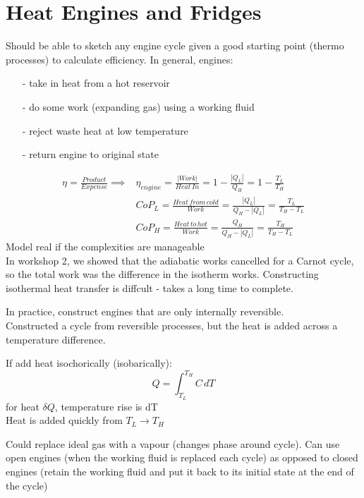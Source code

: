 \documentclass[a4paper, 11pt, normalem]{report}
\begin{document}
\section{Heat Engines and Fridges}
Should be able to sketch any engine cycle given a good starting point (thermo processes) to calculate efficiency. In general, engines:
\begin{itemize}
    \item[-] take in heat from a hot reservoir
    \item[-] do some work (expanding gas) using a working fluid
    \item[-] reject waste heat at low temperature
    \item[-] return engine to original state
\end{itemize}
\begin{align*}
    \eta = \frac{Product}{Expense} \implies& \eta_{engine} = \frac{|Work|}{Heat\,In} = 1 - \frac{|Q_L|}{Q_H} = 1 - \frac{T_L}{T_H} \\
    & CoP_L = \frac{Heat\,from\,cold}{Work} = \frac{|Q_L|}{Q_H - |Q_L|} = \frac{T_L}{T_H - T_L} \\
    & CoP_H = \frac{Heat\,to\,hot}{Work} = \frac{Q_H}{Q_H - |Q_L|} = \frac{T_H}{T_H - T_L}
\end{align*}
Model real if the complexities are manageable \\
In workshop 2, we showed that the adiabatic works cancelled for a Carnot cycle, so the total work was the difference in the isotherm works. Constructing isothermal heat transfer is diffcult - takes a long time to complete.

In practice, construct engines that are only internally reversible. \\
Constructed a cycle from reversible processes, but the heat is added across a temperature difference.

If add heat isochorically (isobarically):
\begin{equation*}
    Q = \int_{T_L}^{T_H} C\,dT
\end{equation*}
for heat $\delta Q$, temperature rise is dT \\
Heat is added quickly from $T_L \to T_H$

Could replace ideal gas with a vapour (changes phase around cycle). Can use open engines (when the working fluid is replaced each cycle) as opposed to closed engines (retain the working fluid and put it back to its initial state at the end of the cycle)
\end{document}
